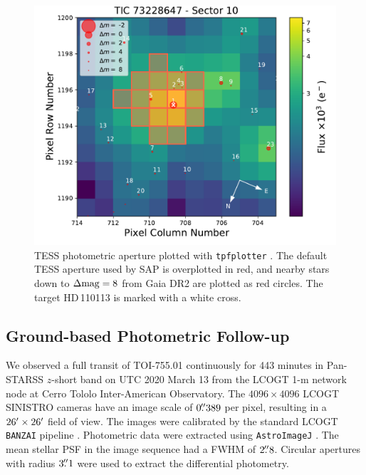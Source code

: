 \documentclass[fleqn,usenatbib]{mnras}
\newcommand{\Tstar}{HD\,110113}
\begin{document}
\begin{figure}
    \centering
    \includegraphics[width=\columnwidth, trim={0 0.8cm 1.8cm 0.1cm}]{TPF_Gaia_TIC73228647_S10}
    \caption{TESS photometric aperture plotted with \texttt{tpfplotter} \citep{2020A&A...635A.128A}. The default TESS aperture used by SAP is overplotted in red, and nearby stars down to $\Delta{\rm mag}=8$ from Gaia DR2 \citep{brown2018gaia} are plotted as red circles. The target \Tstar{} is marked with a white cross.}
    \label{fig:tpf}
\end{figure}

\subsection{Ground-based Photometric Follow-up}
We observed a full transit of TOI-755.01 continuously for 443 minutes in Pan-STARSS $z$-short band on UTC 2020 March 13 from the LCOGT \citep{Brown:2013} 1-m network node at Cerro Tololo Inter-American Observatory.
The $4096\times4096$ LCOGT SINISTRO cameras have an image scale of $0\hbox{$.\!\!^{\prime\prime}$}389$ per pixel, resulting in a $26\hbox{$^\prime$}\times26\hbox{$^\prime$}$ field of view.
The images were calibrated by the standard LCOGT {\tt BANZAI} pipeline \citep{McCully:2018}.
Photometric data were extracted using {\tt AstroImageJ} \citep{Collins:2017}.
The mean stellar PSF in the image sequence had a FWHM of $2\hbox{$.\!\!^{\prime\prime}$}8$.
Circular apertures with radius $3\hbox{$.\!\!^{\prime\prime}$}1$ were used to extract the differential photometry.
\end{document}
